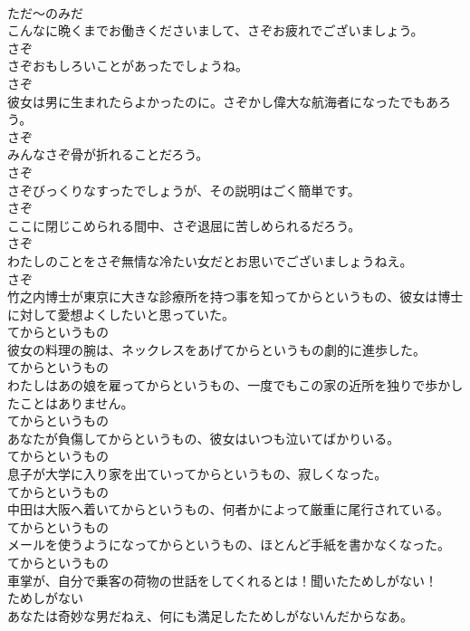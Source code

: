 \documentclass[8pt]{extreport}
\begin{document}
\begin{CJK}{UTF8}{min}
\\	ただ～のみだ
\\	こんなに晩くまでお働きくださいまして、さぞお疲れでございましょう。	
\\	さぞ
\\	さぞおもしろいことがあったでしょうね。	
\\	さぞ
\\	彼女は男に生まれたらよかったのに。さぞかし偉大な航海者になったでもあろう。	
\\	さぞ
\\	みんなさぞ骨が折れることだろう。	
\\	さぞ
\\	さぞびっくりなすったでしょうが、その説明はごく簡単です。	
\\	さぞ
\\	ここに閉じこめられる間中、さぞ退屈に苦しめられるだろう。	
\\	さぞ
\\	わたしのことをさぞ無情な冷たい女だとお思いでございましょうねえ。	
\\	さぞ
\\	竹之内博士が東京に大きな診療所を持つ事を知ってからというもの、彼女は博士に対して愛想よくしたいと思っていた。	
\\	てからというもの
\\	彼女の料理の腕は、ネックレスをあげてからというもの劇的に進歩した。	
\\	てからというもの
\\	わたしはあの娘を雇ってからというもの、一度でもこの家の近所を独りで歩かしたことはありません。	
\\	てからというもの
\\	あなたが負傷してからというもの、彼女はいつも泣いてばかりいる。	
\\	てからというもの
\\	息子が大学に入り家を出ていってからというもの、寂しくなった。	
\\	てからというもの
\\	中田は大阪へ着いてからというもの、何者かによって厳重に尾行されている。	
\\	てからというもの
\\	メールを使うようになってからというもの、ほとんど手紙を書かなくなった。	
\\	てからというもの
\\	車掌が、自分で乗客の荷物の世話をしてくれるとは！聞いたためしがない！	
\\	ためしがない
\\	あなたは奇妙な男だねえ、何にも満足したためしがないんだからなあ。	

\end{CJK}
\end{document}
